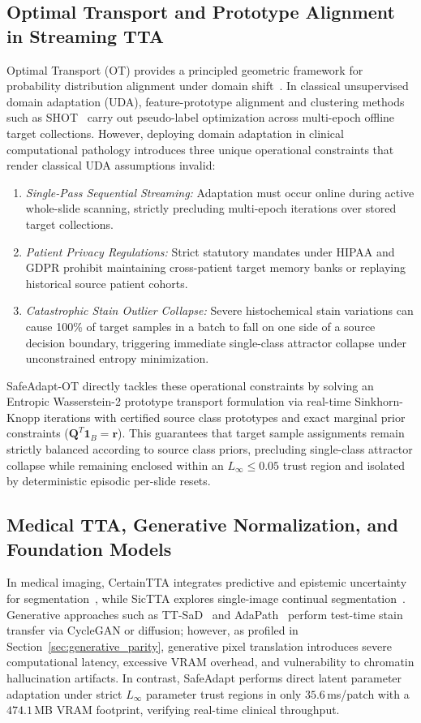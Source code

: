 \documentclass[journal]{IEEEtran}
\begin{document}
\subsection{Optimal Transport and Prototype Alignment in Streaming TTA}
Optimal Transport (OT) provides a principled geometric framework for probability distribution alignment under domain shift~\cite{courty2017optimal}. In classical unsupervised domain adaptation (UDA), feature-prototype alignment and clustering methods such as SHOT~\cite{liang2020shot} carry out pseudo-label optimization across multi-epoch offline target collections. However, deploying domain adaptation in clinical computational pathology introduces three unique operational constraints that render classical UDA assumptions invalid:
\begin{enumerate}
\item \textit{Single-Pass Sequential Streaming:} Adaptation must occur online during active whole-slide scanning, strictly precluding multi-epoch iterations over stored target collections.
\item \textit{Patient Privacy Regulations:} Strict statutory mandates under HIPAA and GDPR prohibit maintaining cross-patient target memory banks or replaying historical source patient cohorts.
\item \textit{Catastrophic Stain Outlier Collapse:} Severe histochemical stain variations can cause 100\% of target samples in a batch to fall on one side of a source decision boundary, triggering immediate single-class attractor collapse under unconstrained entropy minimization.
\end{enumerate}
SafeAdapt-OT directly tackles these operational constraints by solving an Entropic Wasserstein-2 prototype transport formulation via real-time Sinkhorn-Knopp iterations with certified source class prototypes and exact marginal prior constraints ($\mathbf{Q}^T \mathbf{1}_B = \mathbf{r}$). This guarantees that target sample assignments remain strictly balanced according to source class priors, precluding single-class attractor collapse while remaining enclosed within an $L_\infty \le 0.05$ trust region and isolated by deterministic episodic per-slide resets.

\subsection{Medical TTA, Generative Normalization, and Foundation Models}
In medical imaging, CertainTTA integrates predictive and epistemic uncertainty for segmentation~\cite{certaintta2025}, while SicTTA explores single-image continual segmentation~\cite{sictta2026}. Generative approaches such as TT-SaD~\cite{ttsad2024} and AdaPath~\cite{chen2023adapath} perform test-time stain transfer via CycleGAN or diffusion; however, as profiled in Section~\ref{sec:generative_parity}, generative pixel translation introduces severe computational latency, excessive VRAM overhead, and vulnerability to chromatin hallucination artifacts. In contrast, SafeAdapt performs direct latent parameter adaptation under strict $L_\infty$ parameter trust regions in only $35.6$\,ms/patch with a $474.1$\,MB VRAM footprint, verifying real-time clinical throughput.
\end{document}
